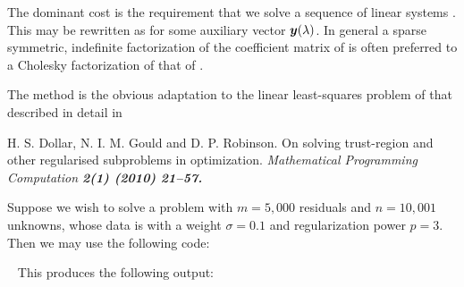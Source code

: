 \documentclass{galahad}
\begin{document}
The dominant cost is the requirement that we solve a sequence of linear systems
. This may be rewritten as
for some auxiliary vector ${\bm{y}}(\lambda)$.
In general a sparse symmetric, indefinite factorization of the
coefficient matrix of  is
often preferred to a Cholesky factorization of that of .

\galreference
The method is the obvious adaptation to the linear least-squares
problem of that described in detail in
\vspace*{1mm}

\noindent
H. S. Dollar, N. I. M. Gould and D. P. Robinson.
On solving trust-region and other regularised subproblems in optimization.
\em Mathematical Programming Computation \bf 2(1) \rm (2010) 21--57.


\galexample
Suppose we wish to solve a problem with $m = 5,000$ residuals
and $n = 10,001$ unknowns, whose data is
with a weight $\sigma = 0.1$ and regularization power $p = 3$.
Then we may use the following code:

{\tt \small
\VerbatimInput{\packageexample}
}
\noindent
This produces the following output:
{\tt \small
\VerbatimInput{\packageresults}
}
\end{document}
